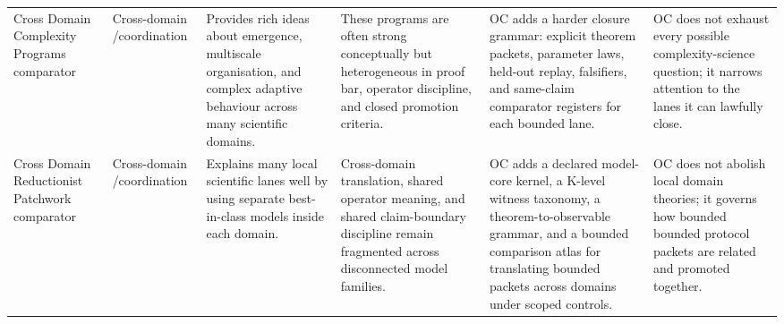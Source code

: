 \begin{longtable}{@{}L{0.17\textwidth}L{0.09\textwidth}L{0.17\textwidth}L{0.17\textwidth}L{0.20\textwidth}L{0.14\textwidth}@{}}
Cross Domain Complexity Programs comparator & Cross-domain /\allowbreak coordination & Provides rich ideas about emergence, multiscale organisation, and complex adaptive behaviour across many scientific domains. & These programs are often strong conceptually but heterogeneous in proof bar, operator discipline, and closed promotion criteria. & OC adds a harder closure grammar: explicit theorem packets, parameter laws, held-out replay, falsifiers, and same-claim comparator registers for each bounded lane. & OC does not exhaust every possible complexity-science question; it narrows attention to the lanes it can lawfully close. \\
Cross Domain Reductionist Patchwork comparator & Cross-domain /\allowbreak coordination & Explains many local scientific lanes well by using separate best-in-class models inside each domain. & Cross-domain translation, shared operator meaning, and shared claim-boundary discipline remain fragmented across disconnected model families. & OC adds a declared model-core kernel, a K-level witness taxonomy, a theorem-to-observable grammar, and a bounded comparison atlas for translating bounded packets across domains under scoped controls. & OC does not abolish local domain theories; it governs how bounded bounded protocol packets are related and promoted together. \\
\bottomrule
\end{longtable}
\endgroup


